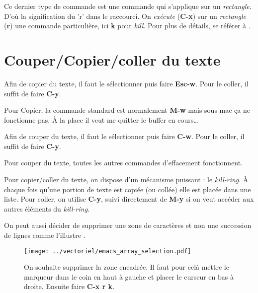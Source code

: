 \documentclass[a4paper,twoside]{article}
\newcommand{\raccourci}[1]{{\bfseries #1}}
\begin{document}
\begin{remarque}
Ce dernier type de commande est une commande qui s'applique sur un \emph{rectangle}. D'où la signification du 'r' dans le raccourci. On \emph{exécute} (\raccourci{C-x}) sur un \emph{rectangle} (\raccourci{r}) une commande particulière, ici \raccourci{k} pour \emph{kill}. Pour plus de détails, se référer à .
\end{remarque}


\section{Couper/Copier/coller du texte}
Afin de copier du texte, il faut le sélectionner puis faire \raccourci{Esc-w}. Pour le coller, il suffit de faire \raccourci{C-y}.

\begin{remarque}
Pour Copier, la commande standard est normalement \raccourci{M-w} mais sous mac ça ne fonctionne pas. À la place il veut me quitter le buffer en cours\dots
\end{remarque}

Afin de couper du texte, il faut le sélectionner puis faire \raccourci{C-w}. Pour le coller, il suffit de faire \raccourci{C-y}.

\bigskip

Pour couper du texte, toutes les autres commandes d'effacement fonctionnent. 

\begin{remarque}
Pour copier/coller du texte, on dispose d'un mécanisme puissant : le \emph{kill-ring}. À chaque fois qu'une portion de texte est copiée (ou collée) elle est placée dans une liste. Pour coller, on utilise \raccourci{C-y}, suivi directement de \raccourci{M-y} si on veut accéder aux autres éléments du \emph{kill-ring}.
\end{remarque}

\bigskip

On peut aussi décider de supprimer une zone de caractères et non une succession de lignes comme l'illustre .

\begin{figure}[htb]
\centering
\texttt{[image: ../vectoriel/emacs\_array\_selection.pdf]}
\caption{On souhaite supprimer la zone encadrée. Il faut pour celà mettre le marqueur dans le coin en haut à gauche et placer le curseur en bas à droite. Ensuite faire \raccourci{C-x r k}.}\label{fig:array_selection}
\end{figure}
\end{document}
